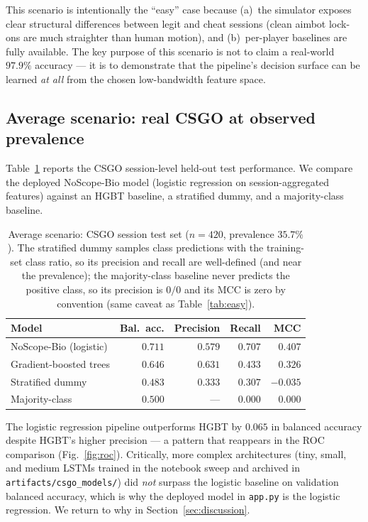 \documentclass[conference,10pt]{IEEEtran}
\begin{document}
This scenario is intentionally the ``easy'' case because (a)~the
simulator exposes clear structural differences between legit and cheat
sessions (clean aimbot lock-ons are much straighter than human motion),
and (b)~per-player baselines are fully available. The key purpose of
this scenario is not to claim a real-world $97.9\%$ accuracy --- it is to
demonstrate that the pipeline's decision surface can be learned
\emph{at all} from the chosen low-bandwidth feature space.

\subsection{Average scenario: real CSGO at observed prevalence}

Table~\ref{tab:average} reports the CSGO session-level held-out test
performance. We compare the deployed NoScope-Bio model (logistic
regression on session-aggregated features) against an HGBT baseline, a
stratified dummy, and a majority-class baseline.

\begin{table}[t]
\caption{Average scenario: CSGO session test set ($n=420$, prevalence
  $35.7\%$). The stratified dummy samples class predictions with the
  training-set class ratio, so its precision and recall are well-defined
  (and near the prevalence); the majority-class baseline never predicts
  the positive class, so its precision is $0/0$ and its MCC is zero by
  convention (same caveat as Table~\ref{tab:easy}).}
\label{tab:average}
\centering
\small
\begin{tabular}{@{}lrrrr@{}}
\toprule
Model                       & Bal.\ acc. & Precision & Recall & MCC \\
\midrule
NoScope-Bio (logistic)      & $\mathbf{0.711}$ & $0.579$ & $0.707$ & $\mathbf{0.407}$ \\
Gradient-boosted trees      & $0.646$ & $0.631$ & $0.433$ & $0.326$ \\
Stratified dummy            & $0.483$ & $0.333$ & $0.307$ & $-0.035$ \\
Majority-class              & $0.500$ & ---     & $0.000$ & $0.000$ \\
\bottomrule
\end{tabular}
\end{table}

The logistic regression pipeline outperforms HGBT by $0.065$ in balanced
accuracy despite HGBT's higher precision --- a pattern that reappears in
the ROC comparison (Fig.~\ref{fig:roc}). Critically, more complex
architectures (tiny, small, and medium LSTMs trained in the notebook
sweep and archived in \texttt{artifacts/csgo\_models/}) did \emph{not}
surpass the logistic baseline on validation balanced accuracy, which is
why the deployed model in \texttt{app.py} is the logistic regression. We
return to why in Section~\ref{sec:discussion}.
\end{document}
